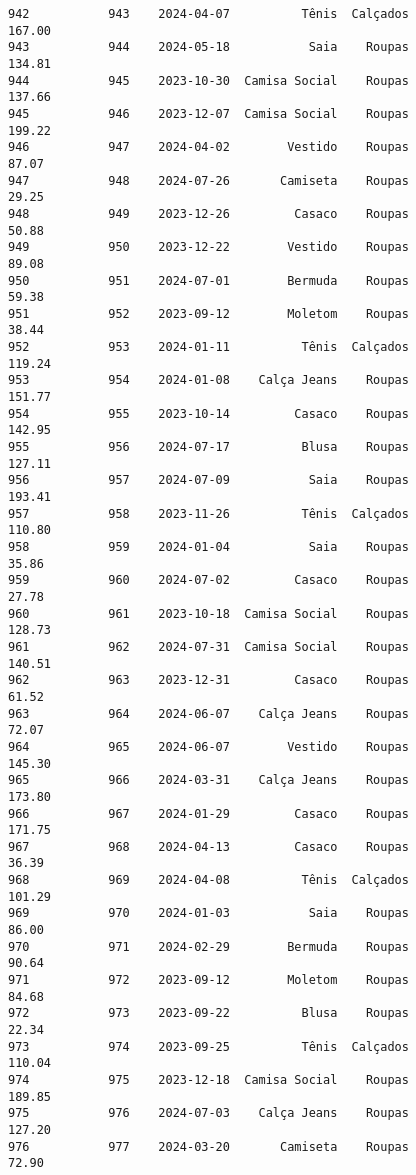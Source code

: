 \documentclass[11pt]{article}
\begin{document}
\begin{Verbatim}[commandchars=\\\{\}]
942           943    2024-04-07          Tênis  Calçados          167.00   
943           944    2024-05-18           Saia    Roupas          134.81   
944           945    2023-10-30  Camisa Social    Roupas          137.66   
945           946    2023-12-07  Camisa Social    Roupas          199.22   
946           947    2024-04-02        Vestido    Roupas           87.07   
947           948    2024-07-26       Camiseta    Roupas           29.25   
948           949    2023-12-26         Casaco    Roupas           50.88   
949           950    2023-12-22        Vestido    Roupas           89.08   
950           951    2024-07-01        Bermuda    Roupas           59.38   
951           952    2023-09-12        Moletom    Roupas           38.44   
952           953    2024-01-11          Tênis  Calçados          119.24   
953           954    2024-01-08    Calça Jeans    Roupas          151.77   
954           955    2023-10-14         Casaco    Roupas          142.95   
955           956    2024-07-17          Blusa    Roupas          127.11   
956           957    2024-07-09           Saia    Roupas          193.41   
957           958    2023-11-26          Tênis  Calçados          110.80   
958           959    2024-01-04           Saia    Roupas           35.86   
959           960    2024-07-02         Casaco    Roupas           27.78   
960           961    2023-10-18  Camisa Social    Roupas          128.73   
961           962    2024-07-31  Camisa Social    Roupas          140.51   
962           963    2023-12-31         Casaco    Roupas           61.52   
963           964    2024-06-07    Calça Jeans    Roupas           72.07   
964           965    2024-06-07        Vestido    Roupas          145.30   
965           966    2024-03-31    Calça Jeans    Roupas          173.80   
966           967    2024-01-29         Casaco    Roupas          171.75   
967           968    2024-04-13         Casaco    Roupas           36.39   
968           969    2024-04-08          Tênis  Calçados          101.29   
969           970    2024-01-03           Saia    Roupas           86.00   
970           971    2024-02-29        Bermuda    Roupas           90.64   
971           972    2023-09-12        Moletom    Roupas           84.68   
972           973    2023-09-22          Blusa    Roupas           22.34   
973           974    2023-09-25          Tênis  Calçados          110.04   
974           975    2023-12-18  Camisa Social    Roupas          189.85   
975           976    2024-07-03    Calça Jeans    Roupas          127.20   
976           977    2024-03-20       Camiseta    Roupas           72.90   

\end{Verbatim}
\end{document}
